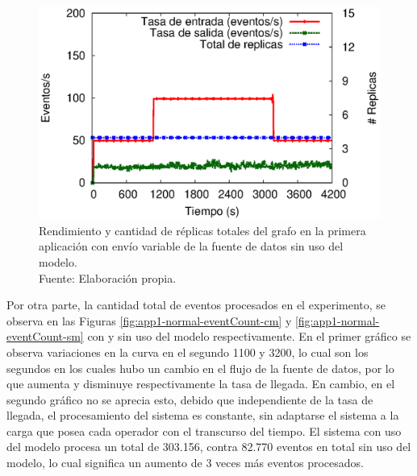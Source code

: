 \begin{figure}[!ht]
	\centering
	\captionsetup{justification=centering}
	\includegraphics[scale=0.7]{images/exp/app1/normal/sm/processSystem.eps}
    \caption[Rendimiento y cantidad de réplicas totales del grafo en la primera aplicación con envío variable de la fuente de datos sin uso del modelo.]{Rendimiento y cantidad de réplicas totales del grafo en la primera aplicación con envío variable de la fuente de datos sin uso del modelo.\\Fuente: Elaboración propia.}
	\label{fig:app1-normal-processSystem-sm}
\end{figure}

Por otra parte, la cantidad total de eventos procesados en el experimento, se observa en las Figuras \ref{fig:app1-normal-eventCount-cm} y \ref{fig:app1-normal-eventCount-sm} con y sin uso del modelo respectivamente. En el primer gráfico se observa variaciones en la curva en el segundo 1100 y 3200, lo cual son los segundos en los cuales hubo un cambio en el flujo de la fuente de datos, por lo que aumenta y disminuye respectivamente la tasa de llegada. En cambio, en el segundo gráfico no se aprecia esto, debido que independiente de la tasa de llegada, el procesamiento del sistema es constante, sin adaptarse el sistema a la carga que posea cada operador con el transcurso del tiempo. El sistema con uso del modelo procesa un total de 303.156, contra 82.770 eventos en total sin uso del modelo, lo cual significa un aumento de 3 veces más eventos procesados.

